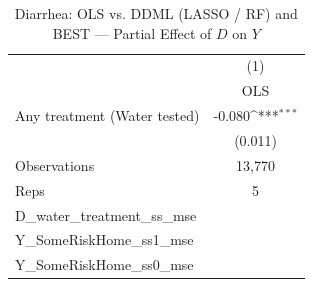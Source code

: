\begin{table}[htbp]\centering
\def\sym#1{\ifmmode^{#1}\else\(^{#1}\)\fi}
\caption{Diarrhea: OLS vs. DDML (LASSO / RF) and BEST — Partial Effect of $D$ on $Y$}
\begin{tabular}{l*{1}{c}}
\toprule
                &\multicolumn{1}{c}{(1)}\\
                &\multicolumn{1}{c}{OLS}\\
\midrule
Any treatment (Water tested)&   -0.080\sym{***}\\
                &  (0.011)         \\
\midrule
Observations    &   13,770         \\
Reps            &        5         \\
D\_water\_treatment\_ss\_mse&                  \\
Y\_SomeRiskHome\_ss1\_mse&                  \\
Y\_SomeRiskHome\_ss0\_mse&                  \\
\bottomrule
\end{tabular}
\end{table}
